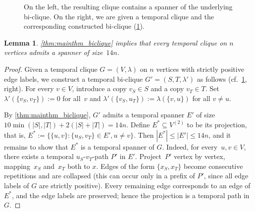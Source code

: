 \documentclass[11pt, letterpaper]{article}
\renewcommand{\subset}{\subseteq}
\theoremstyle{definition}
\theoremstyle{plain}
\newtheorem{lemma}[definition]{Lemma}
\begin{document}
\begin{figure}
\caption{On the left, the resulting clique contains a spanner of the underlying bi-clique.
On the right, we are given a temporal clique and the corresponding constructed bi-clique (\cref{obs:biclique_to_clique}).}
\label{fig:bicliques}
\end{figure}

\begin{lemma}
\label{obs:biclique_to_clique}
\cref{thm:mainthm_biclique} implies that every temporal clique on $n$ vertices admits a spanner of size~$14n$.
\end{lemma}

\begin{proof}
  Given a temporal clique $G = (V, \lambda)$ on $n$ vertices with strictly positive edge
  labels, we construct a temporal bi-clique $G' = (S, T, \lambda')$ as follows
  (cf.~\cref{fig:bicliques}, right). For every $v \in V$, introduce a copy
  $v_S \in S$ and a copy $v_T \in T$. Set $\lambda'(\{v_S, v_T\}) := 0$ for all~$v$
  and $\lambda'(\{v_S, u_T\}) := \lambda(\{v, u\})$ for all $v \neq u$.

By \cref{thm:mainthm_biclique}, $G'$ admits a temporal spanner $E'$ of size $10\min(|S|,|T|) + 2(|S|+|T|) = 14n$.
Define $E^*\subset V^{(2)}$ to be its projection, that is,
 $
    E^* := \bigl\{\{u,v\} : \{u_S, v_T\} \in E', u \neq v\bigr\}.
 $
Then $|E^*| \leq |E'| \leq 14n$, and it remains to show that $E^*$ is a temporal spanner of $G$. 
Indeed, for every~$u, v \in V$, there exists a temporal $u_S$-$v_T$-path $P'$ in $E'$. 
Project~$P'$ vertex by vertex, mapping~$x_S$ and~$x_T$ both to $x$.
Edges of the form $\{x_S,x_T\}$ become consecutive repetitions and are collapsed (this can occur only in a prefix of $P'$, since all edge labels of $G$ are strictly positive). 
Every remaining edge corresponds to an edge of $E^*$, and the edge labels are preserved; hence the projection is a temporal path in $G$.
\end{proof}
\end{document}
